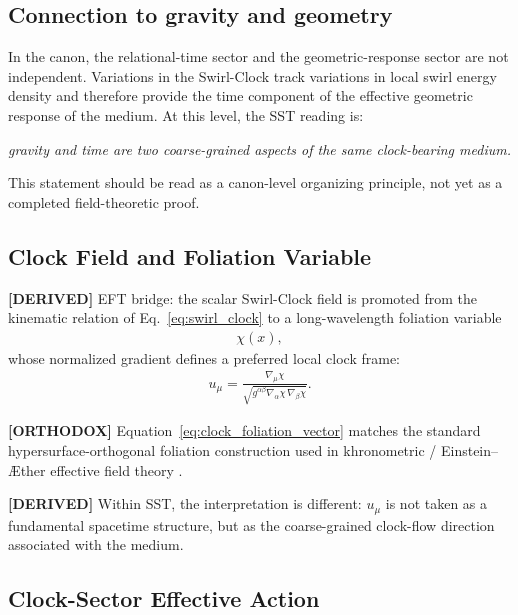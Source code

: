 \documentclass[11pt]{article}
\theoremstyle{definition}
\theoremstyle{plain}
\theoremstyle{remark}
\begin{document}
    \subsection{Connection to gravity and geometry}
        In the canon, the relational-time sector and the geometric-response sector are not independent. Variations in the Swirl-Clock track variations in local swirl energy density and therefore provide the time component of the effective geometric response of the medium. At this level, the SST reading is:
        \begin{center}
            \textit{gravity and time are two coarse-grained aspects of the same clock-bearing medium.}
        \end{center}
        This statement should be read as a canon-level organizing principle, not yet as a completed field-theoretic proof.

    \subsection{Clock Field and Foliation Variable}

        \textbf{[DERIVED]} EFT bridge: the scalar Swirl-Clock field is promoted from the kinematic relation
        of Eq.~\eqref{eq:swirl_clock} to a long-wavelength foliation variable
        \begin{align}
            \chi(x),
        \end{align}
        whose normalized gradient defines a preferred local clock frame:
        \begin{align}
            u_\mu
            =
            \frac{\nabla_\mu \chi}
            {\sqrt{g^{\alpha\beta}\nabla_\alpha\chi\,\nabla_\beta\chi}}.
            \label{eq:clock_foliation_vector}
        \end{align}

        \textbf{[ORTHODOX]} Equation~\eqref{eq:clock_foliation_vector} matches the standard hypersurface-orthogonal
        foliation construction used in khronometric / Einstein--\AE ther effective field theory
        \cite{Jacobson2008,BlasPujolasSibiryakov2011}.

        \textbf{[DERIVED]} Within SST, the interpretation is different: \(u_\mu\) is not taken as a fundamental
        spacetime structure, but as the coarse-grained clock-flow direction associated with the medium.

    \subsection{Clock-Sector Effective Action}
\end{document}

